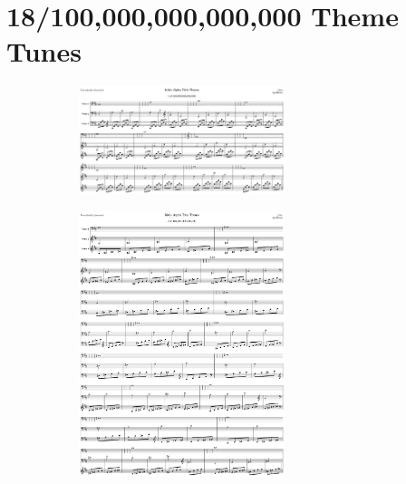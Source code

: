 \chapter{18/100,000,000,000,000 Theme Tunes}


\begin{figure}[H]
{
  \setlength{\tabcolsep}{3.0pt}
  \setlength\cmidrulewidth{\heavyrulewidth} %
    \begin{subfigure}{0.5\textwidth}
  \includegraphics[width=6cm]{music/title_no_1_page_1001.png}%
    \end{subfigure}
  \begin{subfigure}{0.5\textwidth}
  \includegraphics[width=6cm]{music/title_no_2_page_1001.png}%
    \end{subfigure}
}
\end{figure}

\clearpage

